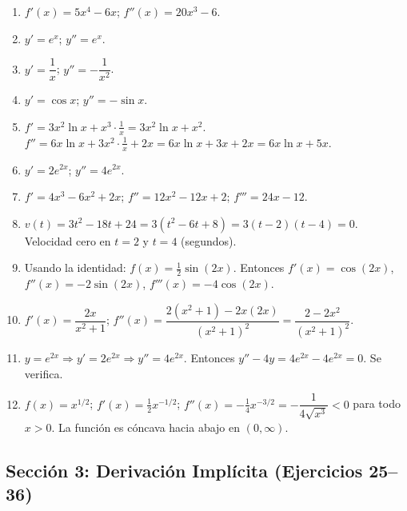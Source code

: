 \documentclass[12pt, letterpaper]{article}
\begin{document}
\begin{enumerate}[resume=respuestas, leftmargin=*, label=\textbf{\arabic*.}]
  \item $f'(x) = 5x^4 - 6x$; $f''(x) = 20x^3 - 6$.
  \item $y' = e^x$; $y'' = e^x$.
  \item $y' = \dfrac{1}{x}$; $y'' = -\dfrac{1}{x^2}$.
  \item $y' = \cos x$; $y'' = -\sin x$.
  \item $f' = 3x^2 \ln x + x^3 \cdot \frac{1}{x} = 3x^2 \ln x + x^2$. $f'' = 6x \ln x + 3x^2 \cdot \frac{1}{x} + 2x = 6x \ln x + 3x + 2x = 6x\ln x + 5x$.
  \item $y' = 2e^{2x}$; $y'' = 4e^{2x}$.
  \item $f' = 4x^3 - 6x^2 + 2x$; $f'' = 12x^2 - 12x + 2$; $f''' = 24x - 12$.
  \item $v(t) = 3t^2 - 18t + 24 = 3(t^2 - 6t + 8) = 3(t - 2)(t - 4) = 0$. Velocidad cero en $t = 2$ y $t = 4$ (segundos).
  \item Usando la identidad: $f(x) = \frac{1}{2}\sin(2x)$. Entonces $f'(x) = \cos(2x)$, $f''(x) = -2\sin(2x)$, $f'''(x) = -4\cos(2x)$.
  \item $f'(x) = \dfrac{2x}{x^2 + 1}$; $f''(x) = \dfrac{2(x^2 + 1) - 2x(2x)}{(x^2 + 1)^2} = \dfrac{2 - 2x^2}{(x^2 + 1)^2}$.
  \item $y = e^{2x} \Rightarrow y' = 2e^{2x} \Rightarrow y'' = 4e^{2x}$. Entonces $y'' - 4y = 4e^{2x} - 4e^{2x} = 0$. Se verifica.
  \item $f(x) = x^{1/2}$; $f'(x) = \frac{1}{2}x^{-1/2}$; $f''(x) = -\frac{1}{4}x^{-3/2} = -\dfrac{1}{4\sqrt{x^3}} < 0$ para todo $x > 0$. La función es cóncava hacia abajo en $(0, \infty)$.
\end{enumerate}

\newpage


\subsection*{Sección 3: Derivación Implícita (Ejercicios 25--36)}
\end{document}
